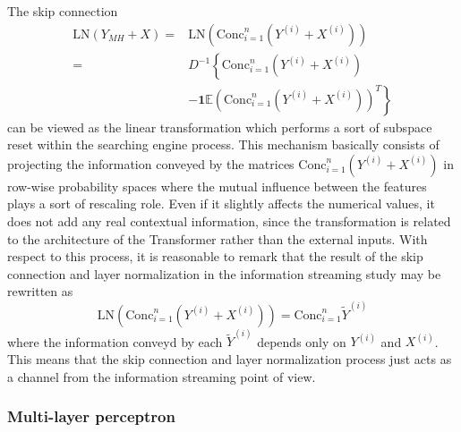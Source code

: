 \documentclass[11pt,a4paper,reqno]{amsart} %
\theoremstyle{definition}
\numberwithin{equation}{section}          %
\begin{document}
The skip connection 
\begin{equation}
\begin{aligned}
\mathrm{LN}(Y_{MH}+X)=&\mathrm{LN}\left(\mathrm{Conc}_{i=1}^n \left(Y^{(i)} + X^{(i)} \right)\right)\\
=&D^{-1}\left\{ \mathrm{Conc}_{i=1}^n \left(Y^{(i)} + X^{(i)} \right)\right. \\
& - \left. \mathbf{1} \mathbb{E}\left(\mathrm{Conc}_{i=1}^n \left(Y^{(i)} + X^{(i)} \right)\right)^T \right\}
\end{aligned}
\end{equation}
can be viewed as the linear transformation which performs a sort of subspace reset within the searching engine process. This mechanism basically consists of projecting the information conveyed by the matrices $\mathrm{Conc}_{i=1}^n \left(Y^{(i)} + X^{(i)} \right)$ in row-wise probability spaces where the mutual influence between the features plays a sort of rescaling role. Even if it slightly affects the numerical values, it does not add any real contextual information, since the transformation is related to the architecture of the Transformer rather than the external inputs. With respect to this process, it is reasonable to remark that the result of the skip connection and layer normalization in the information streaming study may be rewritten as
\begin{equation}
\mathrm{LN}\left(\mathrm{Conc}_{i=1}^n \left(Y^{(i)} + X^{(i)} \right)\right) = \mathrm{Conc}_{i=1}^n \widetilde{Y}^{(i)}
\end{equation}
where the information conveyd by each $\widetilde{Y}^{(i)}$ depends only on $Y^{(i)}$ and $X^{(i)}$. This means that the skip connection and layer normalization process just acts as a channel from the information streaming point of view.

\subsubsection{Multi-layer perceptron}
\end{document}
